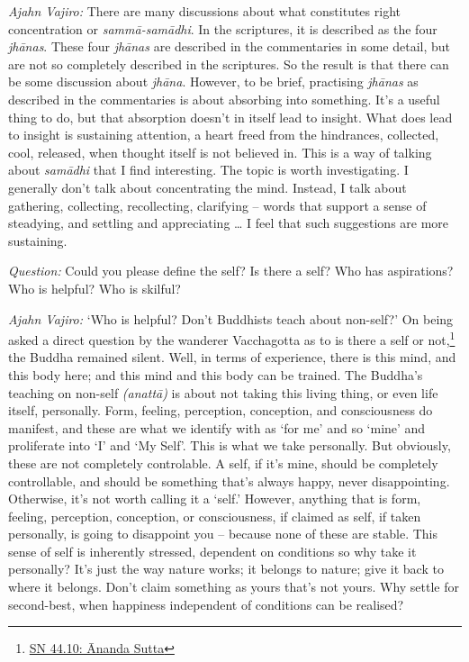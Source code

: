 \emph{Ajahn Vajiro:} There are many discussions about what constitutes right
concentration or \emph{sammā-samādhi}. In the scriptures, it is described as the
four \emph{jhānas}. These four \emph{jhānas} are described in the commentaries
in some detail, but are not so completely described in the scriptures. So the
result is that there can be some discussion about \emph{jhāna}. However, to be
brief, practising \emph{jhānas} as described in the commentaries is about
absorbing into something. It's a useful thing to do, but that absorption doesn't
in itself lead to insight. What does lead to insight is sustaining attention, a
heart freed from the hindrances, collected, cool, released, when thought itself
is not believed in. This is a way of talking about \emph{samādhi} that I find
interesting. The topic is worth investigating. I generally don't talk about
concentrating the mind. Instead, I talk about gathering, collecting,
recollecting, clarifying -- words that support a sense of steadying, and
settling and appreciating \ldots{} I feel that such suggestions are more
sustaining.

\bigskip

\emph{Question:} Could you please define the self? Is there a self? Who has
aspirations? Who is helpful? Who is skilful?

\emph{Ajahn Vajiro:} `Who is helpful? Don't Buddhists teach about non-self?' On being
asked a direct question by the wanderer Vacchagotta as to is there a self or not,\footnote{\href{https://suttacentral.net/sn44.10/en/bodhi}{SN 44.10: Ānanda Sutta}} the Buddha remained silent. Well, in terms of experience,
there is this mind, and this body here; and this mind and this body can be
trained. The Buddha's teaching on non-self \emph{(anattā)} is about not taking
this living thing, or even life itself, personally. Form, feeling, perception,
conception, and consciousness do manifest, and these are what we identify with
as `for me' and so `mine' and proliferate into `I' and `My Self'. This is what we take personally. But obviously, these
are not completely controlable. A self, if it's mine, should be completely
controllable, and should be something that's always happy, never disappointing.
Otherwise, it's not worth calling it a `self.' However, anything that is form,
feeling, perception, conception, or consciousness, if claimed as self, if taken
personally, is going to disappoint you -- because none of these are stable.
This sense of self is inherently stressed, dependent on conditions so why take it personally? It's just the way nature works; it belongs to nature; give it back
to where it belongs. Don't claim something as yours that's not yours. Why settle
for second-best, when happiness independent of conditions can be realised?

